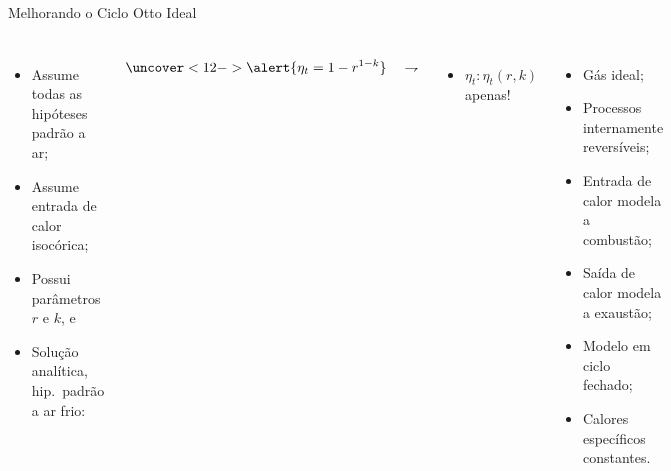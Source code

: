     \begin{frame}{Melhorando o Ciclo Otto Ideal}\vspace*{-2em}
        \begin{columns}
        \begin{itemize}
            \item<2->  Assume todas as \alert{hipóteses padrão a ar};
            \item<8->  Assume entrada de calor \alert{isocórica};
            \item<9->  Possui parâmetros \alert{$r$} e \alert{$k$}, e
            \item<10-> Solução analítica, \alert{hip.~padrão a ar frio}:\\[\bigskipamount]
        \end{itemize}
        \begin{equation*}
            \uncover<12->{\alert{\eta_t = 1 - r^{1-k}}\quad\rightharpoondown}
        \end{equation*}%
        \vspace*{-1em}
        \begin{itemize}
            \item<13-> $\eta_t\!:\!\eta_t(r, k)$ \alert{apenas}!
        \end{itemize}
        \begin{itemize}
            \item<3->  Gás \alert{ideal};
            \item<4->  Processos \alert{internamente reversíveis};
            \item<5->  Entrada de \alert{calor} modela a combustão;
            \item<6->  Saída de \alert{calor} modela a exaustão;
            \item<7->  Modelo em \alert{ciclo fechado};
            \item<11-> Calores específicos \alert{constantes}.
        \end{itemize}
        \end{columns}
    \end{frame}




